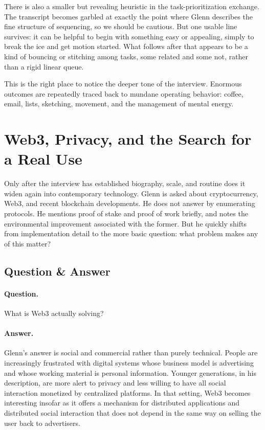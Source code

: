 There is also a smaller but revealing heuristic in the task-prioritization exchange. The transcript becomes garbled at exactly the point where Glenn describes the fine structure of sequencing, so we should be cautious. But one usable line survives: it can be helpful to begin with something easy or appealing, simply to break the ice and get motion started. What follows after that appears to be a kind of bouncing or stitching among tasks, some related and some not, rather than a rigid linear queue.

This is the right place to notice the deeper tone of the interview. Enormous outcomes are repeatedly traced back to mundane operating behavior: coffee, email, lists, sketching, movement, and the management of mental energy.

\section{Web3, Privacy, and the Search for a Real Use}

Only after the interview has established biography, scale, and routine does it widen again into contemporary technology. Glenn is asked about cryptocurrency, Web3, and recent blockchain developments. He does not answer by enumerating protocols. He mentions proof of stake and proof of work briefly, and notes the environmental improvement associated with the former. But he quickly shifts from implementation detail to the more basic question: what problem makes any of this matter?

\subsection{Question \& Answer}

\paragraph{Question.} What is Web3 actually solving?

\paragraph{Answer.} Glenn's answer is social and commercial rather than purely technical. People are increasingly frustrated with digital systems whose business model is advertising and whose working material is personal information. Younger generations, in his description, are more alert to privacy and less willing to have all social interaction monetized by centralized platforms. In that setting, Web3 becomes interesting insofar as it offers a mechanism for distributed applications and distributed social interaction that does not depend in the same way on selling the user back to advertisers.

